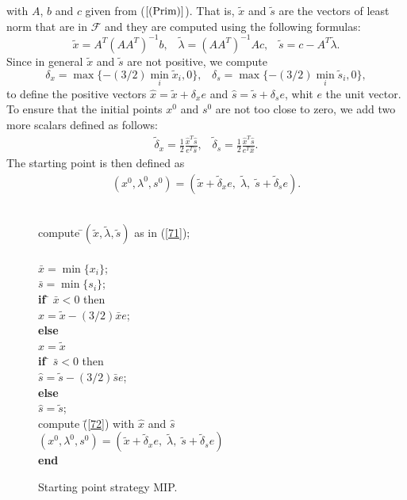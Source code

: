 \documentclass[a4paper,10 pt,titlepage,twoside]{book}
\theoremstyle{plain}
\theoremstyle{definition}
\theoremstyle{remark}
\begin{document}
with $A$, $b$ and $c$ given from ($\ref{(Prim)}$). That is, $\tilde{x}$ and $\tilde{s}$ are the vectors of least norm that are in $\mathcal{F}$ and they are computed using the following formulas:
\begin{equation}\label{71}
\tilde{x} = A^{T}(AA^{T})^{-1}b,\;\;\;\tilde{\lambda}=(AA^{T})^{-1}Ac,\;\;\; \tilde{s} = c- A^{T}\tilde{\lambda}.
\end{equation}
Since in general $\tilde{x}$ and $\tilde{s}$ are not positive, we compute
\begin{equation*}
\delta_{x} = \max\{-(3/2)\min\limits_{i}\tilde{x}_{i},0\},\;\;\; \delta_{s} = \max\{-(3/2)\min\limits_{i}\tilde{s}_{i},0\},
\end{equation*}
to define the positive vectors $\hat{x}= \tilde{x}+\delta_{x}e$ and $\hat{s}= \tilde{s}+\delta_{s}e$, whit $e$ the unit vector. To ensure that the initial points $x^{0}$ and $s^{0}$ are not too close to zero, we add two more scalars defined as follows:
\begin{align}\label{72}
\tilde{\delta}_{x}= \frac{1}{2}\frac{\hat{x}^{T}\hat{s}}{e^{T}\hat{s}},\;\;\;\tilde{\delta}_{s} =\frac{1}{2}\frac{\hat{x}^{T}\hat{s}}{e^{T}\hat{x}}.
\end{align}
The starting point is then defined as 
\begin{align*}
(x^{0}, \lambda^{0}, s^{0}) = (\tilde{x}+\tilde{\delta}_{x} e,\;\tilde{\lambda},\;\tilde{s}+\tilde{\delta}_{s} e).
\end{align*}
\\
\begin{figure}\caption{\label{fig:MIP}Starting point strategy MIP.}
	\centering
	{\noindent\begin{boxedminipage}{1\linewidth}
			\begin{tabbing}
			compute \=$(\tilde{x},\tilde{\lambda},\tilde{s})$ as in (\ref{71});\\				
			\=\\
				\>$\bar{x} = \min\{x_{i}\}$;\\
				\>$\bar{s} = \min\{s_{i}\}$;\\
				\textbf{if} \= $\bar{x}<0$ then\\
				\> $\hat{x}= \tilde{x} -(3/2)\bar{x}e$;\\
				\textbf{else} \=\\
				\> $\hat{x} = \tilde{x}$\\
				\textbf{if} \= $\bar{s}<0$ then\\
				\> $\hat{s}= \tilde{s} -(3/2)\bar{s}e$;\\
				\textbf{else} \=\\
				\> $\hat{s} = \tilde{s}$;\\
				compute \=(\ref{72}) with $\hat{x}$ and $\hat{s}$\\
				\>$(x^{0}, \lambda^{0}, s^{0}) = (\tilde{x}+\tilde{\delta}_{x} e,\;\tilde{\lambda},\;\tilde{s}+\tilde{\delta}_{s} e)$\\
				\textbf{end}
			\end{tabbing}
		\end{boxedminipage}
		} \quad
\end{figure}
\end{document}
